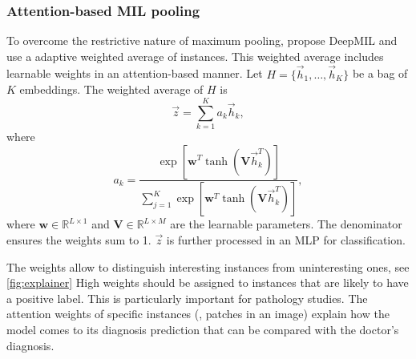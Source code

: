 \subsubsection{Attention-based MIL pooling}
To overcome the restrictive nature of maximum pooling, \textcite{Ilse2018} propose DeepMIL and use a adaptive weighted average of instances.
This weighted average includes learnable weights in an attention-based manner.
Let $H=\{\vec{h}_1, \ldots, \vec{h}_K\}$ be a bag of $K$ embeddings.
The weighted average of $H$ is
\begin{equation}
    \vec{z}=\sum_{k=1}^{K}a_k\vec{h}_k,
\end{equation}
where
\begin{equation}
    a_k = \frac{\exp\left[\mathbf{w}^T \tanh (\mathbf{V}\vec{h}_k^T)\right]}{\sum_{j=1}^{K}\exp\left[\mathbf{w}^T \tanh (\mathbf{V}\vec{h}_k^T)\right]},
\end{equation}
where $\mathbf{w} \in \mathbb{R}^{L \times 1}$ and $\mathbf{V}\in \mathbb{R}^{L \times M}$ are the learnable parameters.
The denominator ensures the weights sum to 1.
$\vec{z}$ is further processed in an MLP for classification.

The weights allow to distinguish interesting instances from uninteresting ones, see \cref{fig:explainer}
High weights should be assigned to instances that are likely to have a positive label.
This is particularly important for pathology studies.
The attention weights of specific instances (\eg, patches in an image) explain how the model comes to its diagnosis prediction that can be compared with the doctor's diagnosis.

\begin{figure*}
    \centering
    
    \caption[Tile importances]{
        Visualizing tile importances.
        The attention weights resulting from VarMIL are min-max-normalized and multiplied with their corresponding tile.
        The output is an attention weighted image with bright parts relating to high attention and dark parts relating to low attention.
        Note that dark tiles can still have high attentions if the original image contains dark patches with useful information.
    }
    \label{fig:explainer}
\end{figure*}

